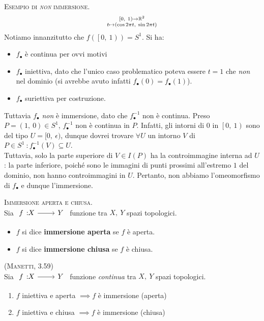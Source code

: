 \begin{example} \textsc{Esempio di \textit{non} immersione.}
	\begin{equation}
		\substack{\left[0,\ 1\right)\rightarrow \mathbb{R}^2\\t\mapsto \left(\cos 2\pi t,\ \sin 2\pi t\right)}
	\end{equation}
Notiamo innanzitutto che $f\left(\left[0,\ 1\right)\right)=S^{1}$. Si ha:
\begin{itemize}
\item $f_{\bullet}$ è continua per ovvi motivi
\item $f_{\bullet}$ iniettiva, dato che l'unico caso problematico poteva essere $t=1$ che \textit{non} nel dominio (si avrebbe avuto infatti $f_{\bullet}\left(0\right)=f_{\bullet}\left(1\right)$).
\item $f_{\bullet}$ suriettiva per costruzione.
\end{itemize}
Tuttavia $f_{\bullet}$ \textit{non} è immersione, dato che $f_{\bullet}^{-1}$ non è continua. Preso $P=\left(1,\ 0\right)\in S^1$, $f_{\bullet}^{-1}$ non è continua in $P$. Infatti, gli intorni di $0$ in $\left[0,\ 1\right)$ sono del tipo $U=[0,\ \epsilon)$, dunque dovrei trovare $\forall U$ un intorno $V$ di $P\in S^1\ \colon f_{\bullet}^{-1}\left(V\right)\subseteq U$.\\
Tuttavia, solo la parte superiore di $V\in I\left(P\right)$ ha la controimmagine interna ad $U$: la parte inferiore, poiché sono le immagini di punti prossimi all'estremo $1$ del dominio, non hanno controimmagini in $U$. Pertanto, non abbiamo l'omeomorfismo di $f_{\bullet}$ e dunque l'immersione.
\end{example}
\begin{define}\textsc{Immersione aperta e chiusa.}\\
Sia $\funz{f}{X}{Y}$ funzione tra $X,\ Y$ spazi topologici.
\begin{itemize}
\item $f$ si dice \textbf{immersione aperta} se $f$ è aperta.
\item $f$ si dice \textbf{immersione chiusa} se $f$ è chiusa.
\end{itemize}
\vspace{-3mm}
\end{define}
\begin{lemming}\textsc{(Manetti, 3.59)}\\
Sia $\funz{f}{X}{Y}$ funzione \textit{continua} tra $X,\ Y$ spazi topologici.
\begin{enumerate}
\item $f$ iniettiva e aperta $\implies f$ è immersione (aperta)
\item $f$ iniettiva e chiusa $\implies f$ è immersione (chiusa)
\end{enumerate}
\vspace{-3mm}
\end{lemming}
